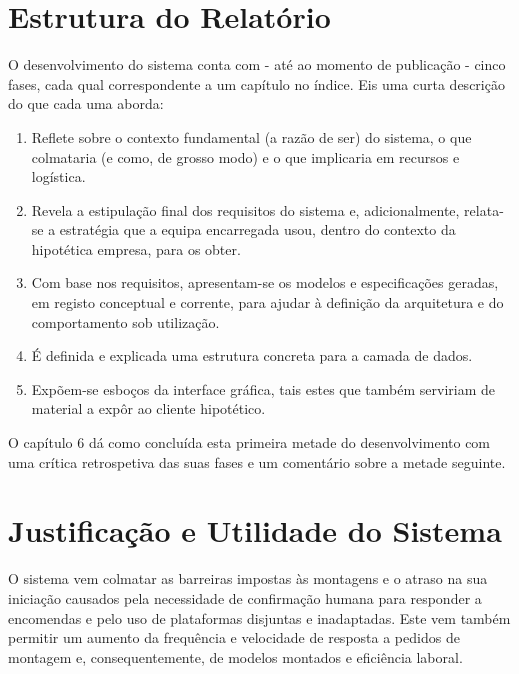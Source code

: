     \newpage
    \section{Estrutura do Relatório}
    
        O desenvolvimento do sistema conta com - até ao momento de publicação - cinco fases, cada qual correspondente a um capítulo no índice. Eis uma curta descrição do que cada uma aborda:
    
        \begin{enumerate}
            \item Reflete sobre o contexto fundamental (a razão de ser) do sistema, o que colmataria (e como, de grosso modo) e o que implicaria em recursos e logística.
            \item Revela a estipulação final dos requisitos do sistema e, adicionalmente, relata-se a estratégia que a equipa encarregada usou, dentro do contexto da hipotética empresa, para os obter.
            \item Com base nos requisitos, apresentam-se os modelos e especificações geradas, em registo conceptual e corrente, para ajudar à definição da arquitetura e do comportamento sob utilização.
            \item É definida e explicada uma estrutura concreta para a camada de dados.
            \item Expõem-se esboços da interface gráfica, tais estes que também serviriam de material a expôr ao cliente hipotético.
        \end{enumerate}

    O capítulo 6 dá como concluída esta primeira metade do desenvolvimento com uma crítica retrospetiva das suas fases e um comentário sobre a metade seguinte.   

    \newpage
    \section{Justificação e Utilidade do Sistema}
        O sistema vem colmatar as barreiras impostas às montagens e o atraso na sua iniciação causados pela necessidade de confirmação humana para responder a encomendas e pelo uso de plataformas disjuntas e inadaptadas. Este vem também permitir um aumento da frequência e velocidade de resposta a pedidos de montagem e, consequentemente, de modelos montados e eficiência laboral.

